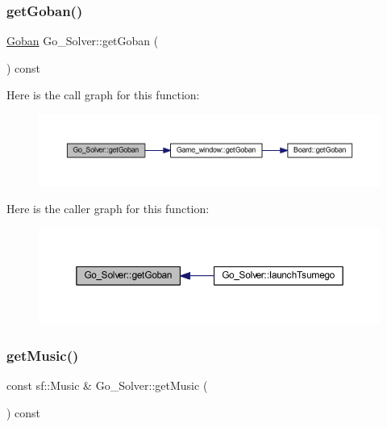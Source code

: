 \subsubsection{\texorpdfstring{get\+Goban()}{getGoban()}}
{\footnotesize\ttfamily \hyperlink{class_goban}{Goban} Go\+\_\+\+Solver\+::get\+Goban (\begin{DoxyParamCaption}{ }\end{DoxyParamCaption}) const}

Here is the call graph for this function\+:
\nopagebreak
\begin{figure}[H]
\begin{center}
\leavevmode
\includegraphics[width=350pt]{class_go___solver_a95c1c268123a76b4f2db5b183bc721b6_cgraph}
\end{center}
\end{figure}
Here is the caller graph for this function\+:
\nopagebreak
\begin{figure}[H]
\begin{center}
\leavevmode
\includegraphics[width=350pt]{class_go___solver_a95c1c268123a76b4f2db5b183bc721b6_icgraph}
\end{center}
\end{figure}
\mbox{\label{class_go___solver_a321bc84b99b5ebdc2fbc59222aae8c74}} 
\subsubsection{\texorpdfstring{get\+Music()}{getMusic()}}
{\footnotesize\ttfamily const sf\+::\+Music \& Go\+\_\+\+Solver\+::get\+Music (\begin{DoxyParamCaption}{ }\end{DoxyParamCaption}) const}

